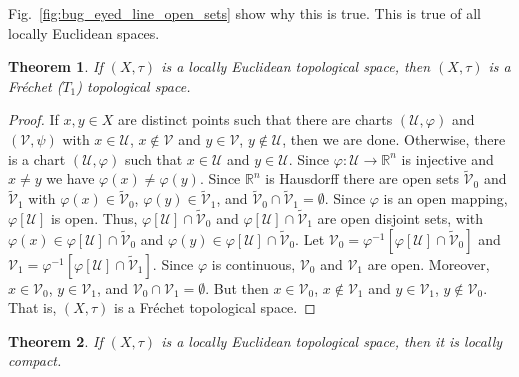 \documentclass{article}
\theoremstyle{plain}
\newtheorem{theorem}{Theorem}[section]
\theoremstyle{normal}
\begin{document}
        Fig.~\ref{fig:bug_eyed_line_open_sets} show why this is true. This is
        true of all locally Euclidean spaces.
        \begin{theorem}
            If $(X,\tau)$ is a locally Euclidean topological space, then
            $(X,\tau)$ is a Fr\'{e}chet ($T_{1}$) topological space.
        \end{theorem}
        \begin{proof}
            If $x,y\in{X}$ are distinct points such that there are charts
            $(\mathcal{U},\varphi)$ and $(\mathcal{V},\psi)$ with
            $x\in\mathcal{U}$, $x\notin\mathcal{V}$ and
            $y\in\mathcal{V}$, $y\notin\mathcal{U}$, then we are done.
            Otherwise, there is a chart $(\mathcal{U},\varphi)$ such that
            $x\in\mathcal{U}$ and $y\in\mathcal{U}$. Since
            $\varphi:\mathcal{U}\rightarrow\mathbb{R}^{n}$ is injective and
            $x\ne{y}$ we have $\varphi(x)\ne\varphi(y)$. Since $\mathbb{R}^{n}$
            is Hausdorff there are open sets $\tilde{\mathcal{V}}_{0}$ and
            $\tilde{\mathcal{V}}_{1}$ with
            $\varphi(x)\in\tilde{\mathcal{V}}_{0}$,
            $\varphi(y)\in\tilde{\mathcal{V}}_{1}$, and
            $\tilde{\mathcal{V}}_{0}\cap\tilde{\mathcal{V}}_{1}=\emptyset$.
            Since $\varphi$ is an open mapping, $\varphi[\mathcal{U}]$ is open.
            Thus, $\varphi[\mathcal{U}]\cap\tilde{\mathcal{V}}_{0}$ and
            $\varphi[\mathcal{U}]\cap\tilde{\mathcal{V}}_{1}$ are open disjoint
            sets, with
            $\varphi(x)\in\varphi[\mathcal{U}]\cap\tilde{\mathcal{V}}_{0}$ and
            $\varphi(y)\in\varphi[\mathcal{U}]\cap\tilde{\mathcal{V}}_{0}$.
            Let $\mathcal{V}_{0}=\varphi^{-1}[\varphi[\mathcal{U}]\cap\tilde{\mathcal{V}}_{0}]$
            and $\mathcal{V}_{1}=\varphi^{-1}[\varphi[\mathcal{U}]\cap\tilde{\mathcal{V}}_{1}]$.
            Since $\varphi$ is continuous, $\mathcal{V}_{0}$ and
            $\mathcal{V}_{1}$ are open. Moreover,
            $x\in\mathcal{V}_{0}$, $y\in\mathcal{V}_{1}$, and
            $\mathcal{V}_{0}\cap\mathcal{V}_{1}=\emptyset$. But then
            $x\in\mathcal{V}_{0}$, $x\notin\mathcal{V}_{1}$ and
            $y\in\mathcal{V}_{1}$, $y\notin\mathcal{V}_{0}$. That is,
            $(X,\tau)$ is a Fr\'{e}chet topological space.
        \end{proof}
        \begin{theorem}
            If $(X,\tau)$ is a locally Euclidean topological space, then it
            is locally compact.
        \end{theorem}
\end{document}

